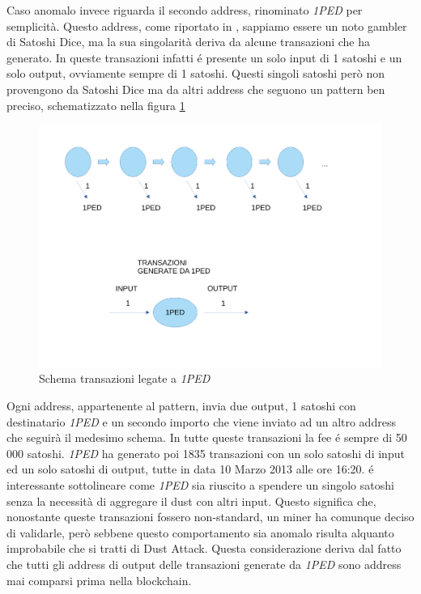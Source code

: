 Caso anomalo invece riguarda il secondo address, rinominato \textit{1PED} per semplicità. Questo address, come riportato in \cite{dustAnalisi}, sappiamo essere un noto gambler di Satoshi Dice, ma la sua singolarità deriva da alcune transazioni che ha generato. In queste transazioni infatti é presente un solo input di 1 satoshi e un solo output, ovviamente sempre di 1 satoshi. Questi singoli satoshi però non provengono da Satoshi Dice ma da altri address che seguono un pattern ben preciso, schematizzato nella figura \ref{fig:1PED}
\begin{figure}[h!]
    \centering
    \includegraphics[scale=0.4]{Images/1Ped.pdf}
    \caption{Schema transazioni legate a \textit{1PED}}
    \label{fig:1PED}
\end{figure}
\FloatBarrier
Ogni address, appartenente al pattern, invia due output, 1 satoshi con destinatario \textit{1PED} e un secondo importo che viene inviato ad un altro address che seguirà il medesimo schema. In tutte queste transazioni la fee é sempre di 50 000 satoshi. \textit{1PED} ha generato poi 1835 transazioni con un solo satoshi di input ed un solo satoshi di output, tutte in data 10 Marzo 2013 alle ore 16:20. é interessante sottolineare come \textit{1PED} sia riuscito a spendere un singolo satoshi senza la necessità di aggregare il dust con altri input. Questo significa che, nonostante queste transazioni fossero non-standard, un miner ha comunque deciso di validarle, però sebbene questo comportamento sia anomalo risulta alquanto improbabile che si tratti di Dust Attack. Questa considerazione deriva dal fatto che tutti gli address di output delle transazioni generate da \textit{1PED} sono address mai comparsi prima nella blockchain.

